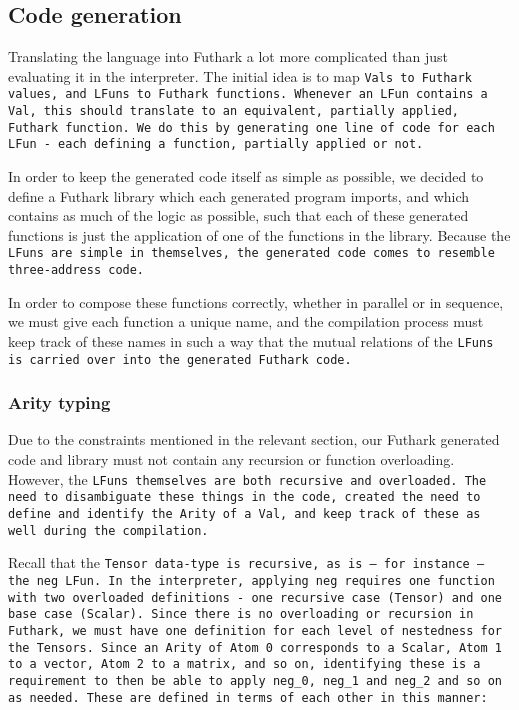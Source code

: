 \subsection{Code generation}\label{sec:codegen}
Translating the language into Futhark a lot more complicated than just
evaluating it in the interpreter.  The initial idea is to map \tt{Val}s to
Futhark values, and \tt{LFun}s to Futhark functions.  Whenever an
\tt{LFun} contains a \tt{Val}, this should translate to an equivalent,
partially applied, Futhark function.  We do this by generating one line
of code for each \tt{LFun} - each defining a function, partially applied
or not.

In order to keep the generated code itself as simple as possible, we decided
to define a Futhark library which each generated program imports, and
which contains as much of the logic as possible, such that each of these
generated functions is just the application of one of the functions in the
library.  Because the \tt{LFun}s are simple in themselves, the generated code
comes to resemble three-address code.

In order to compose these functions correctly, whether in parallel or in
sequence, we must give each function a unique name, and the compilation
process must keep track of these names in such a way that the mutual
relations of the \tt{LFun}s is carried over into the generated Futhark
code.

\subsubsection{Arity typing}
Due to the constraints mentioned in the relevant section, our Futhark
generated code and library must not contain any recursion or function
overloading.  However, the \tt{LFun}s themselves are both recursive and
overloaded.  The need to disambiguate these things in the code, created the
need to define and identify the \tt{Arity} of a \tt{Val}, and keep track of
these as well during the compilation.

Recall that the \tt{Tensor} data-type is recursive, as is --- for instance --
the \tt{neg} \tt{LFun}.  In the interpreter, applying \tt{neg} requires one
function with two overloaded definitions - one recursive case (\tt{Tensor})
and one base case (\tt{Scalar}).  Since there is no overloading or recursion
in Futhark, we must have one definition for each level of nestedness for
the \tt{Tensor}s.  Since an \tt{Arity} of \tt{Atom 0} corresponds to a
\tt{Scalar}, \tt{Atom 1} to a vector, \tt{Atom 2} to a matrix, and so on,
identifying these is a requirement to then be able to apply \tt{neg\_0},
\tt{neg\_1} and \tt{neg\_2} and so on as needed.  These are defined in
terms of each other in this manner:

